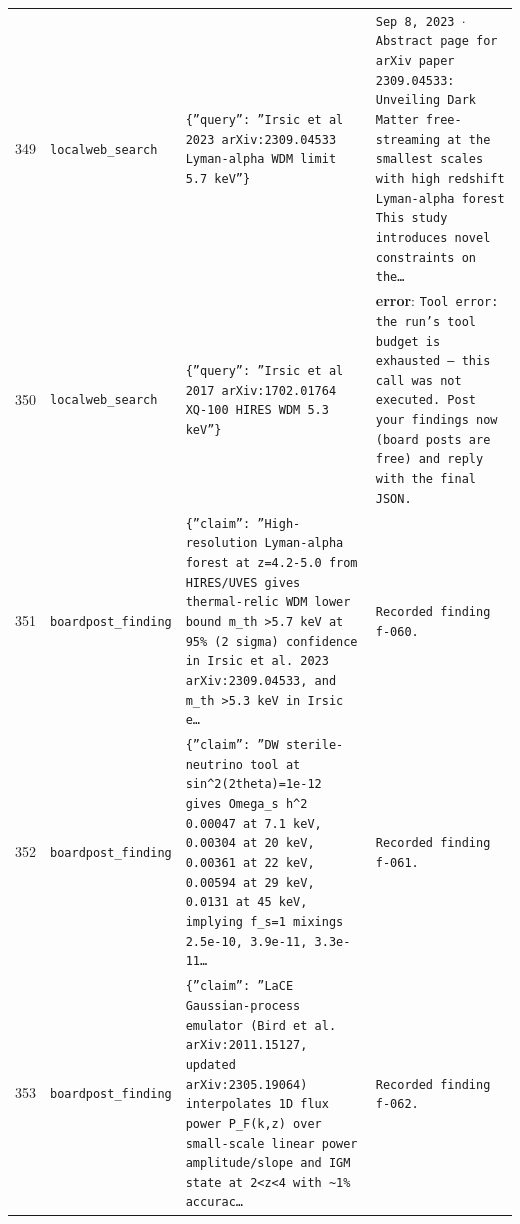 \documentclass[11pt,a4paper]{article}
\begin{document}
\begin{longtable}{@{}p{}p{}p{}p{}@{}}
349 & \texttt{local}\newline\texttt{web\_\allowbreak{}search} & \texttt{\{''query'':\allowbreak{} ''Irsic et al 2023 arXiv:\allowbreak{}2309.04533 Lyman-alpha WDM limit 5.7 keV''\}\allowbreak{}} & \texttt{Sep 8,\allowbreak{} 2023 $\cdot$ Abstract page for arXiv paper 2309.04533:\allowbreak{} Unveiling Dark Matter free-streaming at the smallest scales with high redshift Lyman-alpha forest This study introduces novel constraints on the\ldots{}\allowbreak{}} \\
350 & \texttt{local}\newline\texttt{web\_\allowbreak{}search} & \texttt{\{''query'':\allowbreak{} ''Irsic et al 2017 arXiv:\allowbreak{}1702.01764 XQ-100 HIRES WDM 5.3 keV''\}\allowbreak{}} & \textbf{error}: \texttt{Tool error:\allowbreak{} the run's tool budget is exhausted --- this call was not executed. Post your findings now (board posts are free)\allowbreak{} and reply with the final JSON.} \\
351 & \texttt{board}\newline\texttt{post\_\allowbreak{}finding} & \texttt{\{''claim'':\allowbreak{} ''High-resolution Lyman-alpha forest at z=\allowbreak{}4.2-5.0 from HIRES/\allowbreak{}UVES gives thermal-relic WDM lower bound m\_\allowbreak{}th \textgreater{}\allowbreak{}5.7 keV at 95\% (2 sigma)\allowbreak{} confidence in Irsic et al. 2023 arXiv:\allowbreak{}2309.04533,\allowbreak{} and m\_\allowbreak{}th \textgreater{}\allowbreak{}5.3 keV in Irsic e\ldots{}\allowbreak{}} & \texttt{Recorded finding f-060.} \\
352 & \texttt{board}\newline\texttt{post\_\allowbreak{}finding} & \texttt{\{''claim'':\allowbreak{} ''DW sterile-neutrino tool at sin\textasciicircum{}\allowbreak{}2(2theta)\allowbreak{}=\allowbreak{}1e-12 gives Omega\_\allowbreak{}s h\textasciicircum{}\allowbreak{}2 0.00047 at 7.1 keV,\allowbreak{} 0.00304 at 20 keV,\allowbreak{} 0.00361 at 22 keV,\allowbreak{} 0.00594 at 29 keV,\allowbreak{} 0.0131 at 45 keV,\allowbreak{} implying f\_\allowbreak{}s=\allowbreak{}1 mixings 2.5e-10,\allowbreak{} 3.9e-11,\allowbreak{} 3.3e-11\ldots{}\allowbreak{}} & \texttt{Recorded finding f-061.} \\
353 & \texttt{board}\newline\texttt{post\_\allowbreak{}finding} & \texttt{\{''claim'':\allowbreak{} ''LaCE Gaussian-process emulator (Bird et al. arXiv:\allowbreak{}2011.15127,\allowbreak{} updated arXiv:\allowbreak{}2305.19064)\allowbreak{} interpolates 1D flux power P\_\allowbreak{}F(k,\allowbreak{}z)\allowbreak{} over small-scale linear power amplitude/\allowbreak{}slope and IGM state at 2\textless{}\allowbreak{}z\textless{}\allowbreak{}4 with \textasciitilde{}\allowbreak{}1\% accurac\ldots{}\allowbreak{}} & \texttt{Recorded finding f-062.} \\

\end{longtable}
\end{document}
